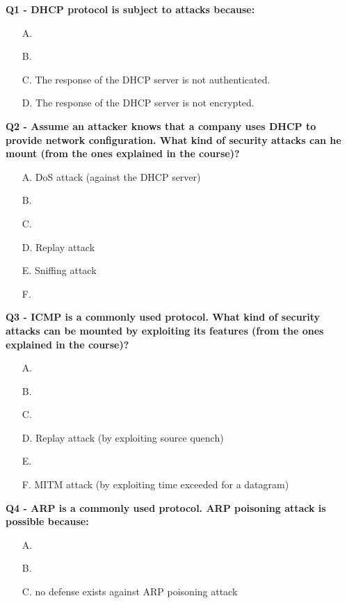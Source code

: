 \textbf{Q1 - DHCP protocol is subject to attacks because:}
\begin{itemize}
    \item[A.] 
    \item[B.] 
    \item[C.] The response of the DHCP server is not authenticated.
    \item[D.] The response of the DHCP server is not encrypted.
\end{itemize}

\textbf{Q2 - Assume an attacker knows that a company uses DHCP to provide network configuration. What kind of security attacks can he mount (from the ones explained in the course)?}
\begin{itemize}
    \item[A.] DoS attack (against the DHCP server)
    \item[B.] 
    \item[C.] 
    \item[D.] Replay attack
    \item[E.] Sniffing attack
    \item[F.] 
\end{itemize}


\textbf{Q3 - ICMP is a commonly used protocol. What kind of security attacks can be mounted by exploiting its features (from the ones explained in the course)?}
\begin{itemize}
    \item[A.] 
    \item[B.] 
    \item[C.] 
    \item[D.] Replay attack (by exploiting source quench)
    \item[E.] 
    \item[F.] MITM attack (by exploiting time exceeded for a datagram)
\end{itemize}

\textbf{Q4 - ARP is a commonly used protocol. ARP poisoning attack is possible because:}
\begin{itemize}
    \item[A.] 
    \item[B.] 
    \item[C.] no defense exists against ARP poisoning attack
\end{itemize}

